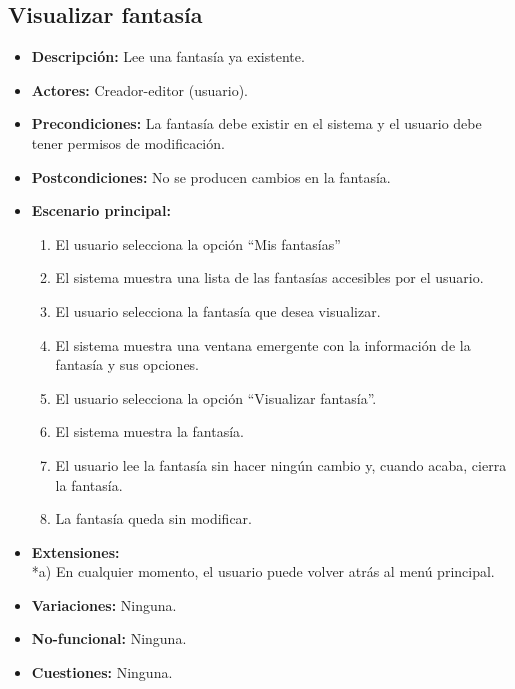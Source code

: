 \subsection{Visualizar fantasía}
\begin{itemize}
	\item \textbf{Descripción:} Lee una fantasía ya existente.
	\item \textbf{Actores:} Creador-editor (usuario).
	\item \textbf{Precondiciones:} La fantasía debe existir en el sistema y el usuario debe tener permisos de modificación.
	\item \textbf{Postcondiciones:} No se producen cambios en la fantasía.
	\item \textbf{Escenario principal:}
	\begin{enumerate}
		\item El usuario selecciona la opción ``Mis fantasías''
		\item El sistema muestra una lista de las fantasías accesibles por el usuario.
		\item El usuario selecciona la fantasía que desea visualizar.
		\item El sistema muestra una ventana emergente con la información de la fantasía y sus opciones.
		\item El usuario selecciona la opción ``Visualizar fantasía''.
		\item El sistema muestra la fantasía.
		\item El usuario lee la fantasía sin hacer ningún cambio y, cuando acaba, cierra la fantasía.
		\item La fantasía queda sin modificar.
	\end{enumerate}
	\item \textbf{Extensiones:} \\ *a) En cualquier momento, el usuario puede volver atrás al menú principal.
	\item \textbf{Variaciones:} Ninguna.
	\item \textbf{No-funcional:} Ninguna.
	\item \textbf{Cuestiones:} Ninguna.
\end{itemize}

